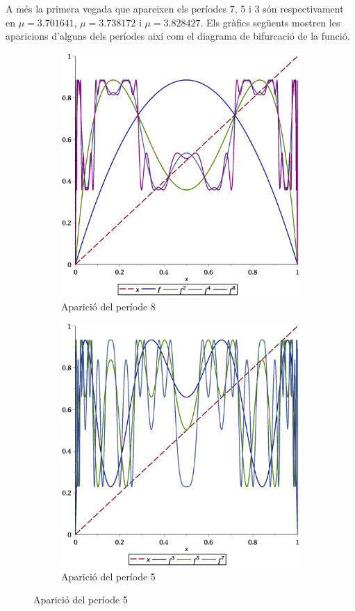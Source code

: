 \documentclass[a4paper]{article}
\theoremstyle{definition}
\begin{document}
A més la primera vegada que apareixen els períodes 7, 5 i 3 són respectivament en $\mu = 3.701641$, $\mu= 3.738172$ i $\mu = 3.828427$.
Els gràfics següents mostren les aparicions d'alguns dels períodes així com el diagrama de bifurcació de la funció.
\begin{figure}[ht]
  \begin{subfigure}[ht]{0.45\linewidth}
    \centering
    \includegraphics[width=\linewidth]{Images/map12.eps}
    \caption{Aparició del període 8}
  \end{subfigure}
  \hfill
  \begin{subfigure}[ht]{0.45\linewidth}
    \centering
    \includegraphics[width=\linewidth]{Images/map15.eps}
    \caption{Aparició del període 5}
  \end{subfigure}
\end{figure}
\end{document}
